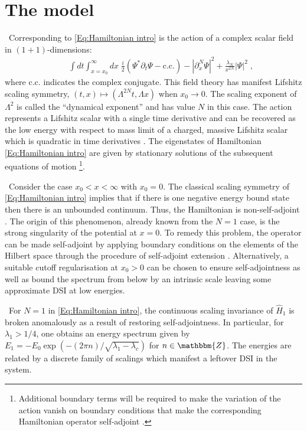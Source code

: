 \documentclass[aps,prl,reprint,preprintnumbers]{revtex4-1}
\begin{document}
\section{The model}

{\ Corresponding to \eqref{Eq:Hamiltonian intro} is the action of a complex scalar field in $(1+1)$-dimensions:
  \begin{eqnarray}
	\label{Eq:Action}
    &\;& \int dt \int_{x=x_{0}}^{\infty} dx \; \frac{i}{2} \left( \Psi^{*} \partial_{t} \Psi - \mathrm{c.c.} \right) 
	 - \left| \partial_{x}^{N} \Psi \right|^{2} + \frac{\lambda_{N}}{x^{2N}} \left| \Psi \right|^2 \; , \nonumber
  \end{eqnarray}
where $\mathrm{c.c.}$ indicates the complex conjugate. This field theory has manifest Lifshitz scaling symmetry, $(t,x) \mapsto (\Lambda^{2N} t, \Lambda x)$ when $x_{0} \rightarrow 0$. The scaling exponent of $\Lambda^{2}$ is called the ``dynamical exponent'' and has value $N$ in this case. The action represents a Lifshitz scalar with a single time derivative and can be recovered as the low energy with respect to mass limit of a charged, massive Lifshitz scalar which is quadratic in time derivatives \cite{Pal:2016rpz}. The eigenstates of Hamiltonian \eqref{Eq:Hamiltonian intro} are given by stationary solutions of the subsequent equations of motion \footnote{Additional boundary terms will be required to make the variation of the action vanish on boundary conditions that make the corresponding Hamiltonian operator self-adjoint \cite{Asorey:2006pr}.}.}
 
{\ Consider the case $x_0 < x < \infty$ with $x_0 = 0$. The classical scaling symmetry of \eqref{Eq:Hamiltonian intro} implies that if there is one negative energy bound state then there is an unbounded continuum. Thus, the Hamiltonian is non-self-adjoint \cite{Bonneau:1999zq,2015AnHP...16.2367I}. The origin of this phenomenon, already known from the $N=1$ case, is the strong singularity of the potential at $x=0$. To remedy this problem, the operator can be made self-adjoint by applying boundary conditions on the elements of the Hilbert space through the procedure of self-adjoint extension \cite{Gitman:2009era}. Alternatively, a suitable cutoff regularisation at $x_0>0$ can be chosen to ensure self-adjointness as well as bound the spectrum from below by an intrinsic scale \cite{Camblong:2000ec} leaving some approximate DSI at low energies.}
 
{\ For $N=1$ in \eqref{Eq:Hamiltonian intro}, the continuous scaling invariance of $\hat{H}_{1}$ is broken anomalously as a result of restoring self-adjointness. In particular, for $\lambda_{1}>1/4$, one obtains an energy spectrum given by $E_{1} = - E_{0} \exp \left( - (2 \pi n) / \sqrt{\lambda_{1}-\lambda_{c}} \right)$ for $n \in \mathbbm{Z}$. The energies are related by a discrete family of scalings which manifest a leftover DSI in the system.}
\end{document}
